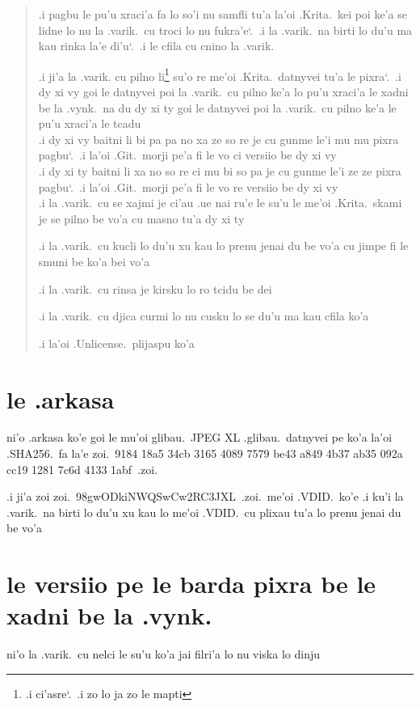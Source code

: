 \documentclass{report}
\newcommand\sds{\spacefactor\sfcode`.\ \space}
\begin{document}
\begin{quote}
	.i pagbu le pu'u xraci'a fa lo so'i nu samfli tu'a la'oi .Krita.\ kei poi ke'a se lidne lo nu la .varik.\ cu troci lo nu fukra'e\sds  .i la .varik.\ na birti lo du'u ma kau rinka la'e di'u\sds  .i le cfila cu cnino la .varik.

	.i ji'a la .varik. cu pilno li\footnote{.i ci'asre\sds  .i zo lo ja zo le mapti}  su'o re me'oi .Krita.\ datnyvei tu'a le pixra\sds  .i dy xi vy goi le datnyvei poi la .varik.\ cu pilno ke'a lo pu'u xraci'a le xadni be la .vynk.\ na du dy xi ty goi le datnyvei poi la .varik.\ cu pilno ke'a le pu'u xraci'a le tcadu\\
	.i dy xi vy baitni li bi pa pa no xa ze so re je cu gunme le'i mu mu pixra pagbu\sds  .i la'oi .Git.\ morji pe'a fi le vo ci versiio be dy xi vy\\
	.i dy xi ty baitni li xa no so re ci mu bi so pa je cu gunme le'i ze ze pixra pagbu\sds  .i la'oi .Git.\ morji pe'a fi le vo re versiio be dy xi vy\\
	.i la .varik.\ cu se xajmi je ci'au .ue nai ru'e le su'u le me'oi .Krita.\ skami je se pilno be vo'a cu masno tu'a dy xi ty

	.i la .varik.\ cu kucli lo du'u xu kau lo prenu jenai du be vo'a cu jimpe fi le smuni be ko'a bei vo'a

	.i la .varik.\ cu rinsa je kirsku lo ro tcidu be dei

	.i la .varik.\ cu djica curmi lo nu cusku lo se du'u ma kau cfila ko'a

	.i la'oi .Unlicense.\ plijaspu ko'a
\end{quote}

\section{le .arkasa}
ni'o .arkasa ko'e goi le mu'oi glibau.\ JPEG XL .glibau.\ datnyvei pe ko'a la'oi .SHA256.\ fa la'e zoi.\ 9184 18a5 34cb 3165 4089 7579 be43 a849 4b37 ab35 092a cc19 1281 7c6d 4133 1abf\ .zoi.

.i ji'a zoi zoi.\ 98gwODkiNWQSwCw2RC3JXL\ .zoi.\ me'oi .VDID.\ ko'e  .i ku'i la .varik.\ na birti lo du'u xu kau lo me'oi .VDID.\ cu plixau tu'a lo prenu jenai du be vo'a

\section{le versiio pe le barda pixra be le xadni be la .vynk.}
ni'o la .varik.\ cu nelci le su'u ko'a jai filri'a lo nu viska lo dinju
\end{document}
